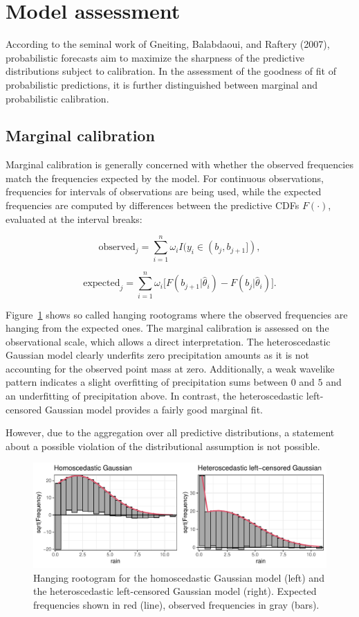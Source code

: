\documentclass[twoside]{report}
\begin{document}
\section{Model assessment}

According to the seminal work of Gneiting, Balabdaoui, and Raftery (2007),
probabilistic forecasts aim to maximize the sharpness of the predictive
distributions subject to calibration. 
In the assessment of the goodness of fit of probabilistic predictions,
it is further distinguished between marginal and probabilistic calibration.

\subsection{Marginal calibration}


Marginal calibration is generally concerned with whether the observed
frequencies match the frequencies expected by the model.  For continuous
observations, frequencies for intervals of observations are being used, while
the expected frequencies are computed by differences between the predictive
CDFs $F(\cdot)$, evaluated at the interval breaks:


$$
\text{observed}_j = \sum_{i=1}^n \omega_i I(y_i \in (b_j, b_{j+1}]),
$$

$$
\text{expected}_j = \sum_{i=1}^n \omega_i \big[ F(b_{j+1} | \hat{\theta}_i) - F(b_{j} | \hat{\theta}_i) \big].
$$

Figure~\ref{stauffer:fig1} shows so called hanging rootograms where the
observed frequencies are hanging from the expected ones. The marginal
calibration is assessed on the observational scale, which allows a direct
interpretation.  The heteroscedastic Gaussian model clearly underfits zero
precipitation amounts as it is not accounting for the observed point mass at
zero. Additionally, a weak wavelike pattern indicates a slight overfitting of
precipitation sums between $0$ and $5$ and an underfitting of precipitation
above. In contrast, the heteroscedastic left-censored Gaussian model provides a
fairly good marginal fit.

However, due to the aggregation over all predictive distributions, a statement
about a possible violation of the distributional assumption is not possible.

\begin{figure}[!ht]\centering
    \includegraphics[width=\textwidth]{Stauffer-rootograms}
    \caption{\label{stauffer:fig1}
        Hanging rootogram for the homoscedastic Gaussian model (left)
        and the heteroscedastic left-censored Gaussian model (right).
        Expected frequencies shown in red (line), observed frequencies
        in gray (bars).
    }
\end{figure}
\end{document}
